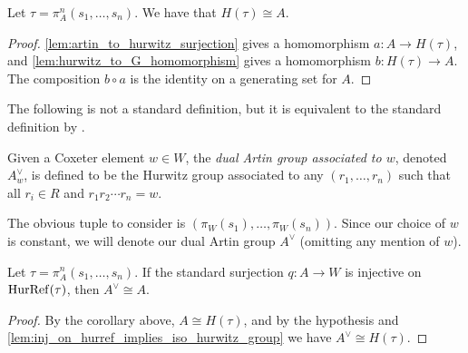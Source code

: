 \begin{corollary}
	Let $\tau = \pi_A^n(s_1,\ldots,s_n)$.
	We have that $H(\tau) \cong A$.
\end{corollary}
\begin{proof}
	\cref{lem:artin_to_hurwitz_surjection} gives a homomorphism $a \colon A \to H(\tau)$, and \cref{lem:hurwitz_to_G_homomorphism} gives a homomorphism $b \colon H(\tau) \to A$.
	The composition $b \circ a$ is the identity on a generating set for $A$.
\end{proof}

The following is not a standard definition, but it is equivalent to the standard definition by \cite[Lemma 7.11]{bessis_topology_2004}.
\begin{definition}
	Given a Coxeter element $w \in W$, the \emph{dual Artin group associated to  $w$}, denoted $A^\vee_w$, is defined to be the Hurwitz group associated to any $(r_1,\ldots,r_n)$ such that all $r_i \in R$ and  $r_1r_2\cdots r_n=w$.
\end{definition}
The obvious tuple to consider is $(\pi_W(s_1),\ldots,\pi_W(s_n))$.
Since our choice of $w$ is constant, we will denote our dual Artin group  $A^\vee$ (omitting any mention of  $w$).

\begin{theorem}
	Let $\tau = \pi^n_A(s_1,\ldots,s_n)$.
	If the standard surjection $q \colon A \to W$ is injective on  $\operatorname{HurRef}(\tau)$, then $A^\vee \cong A$.
\end{theorem}
\begin{proof}
	By the corollary above, $A \cong H(\tau)$, and by the hypothesis and \cref{lem:inj_on_hurref_implies_iso_hurwitz_group} we have $A^\vee \cong H(\tau)$.
\end{proof}


